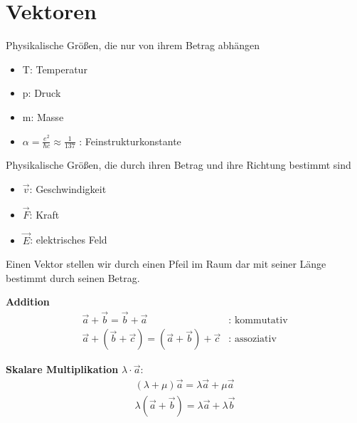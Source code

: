 \section{Vektoren}

\begin{Definition}[Skalar]
 Physikalische Größen, die nur von ihrem Betrag abhängen
\begin{itemize}
 \item T: Temperatur
\item p: Druck
\item m: Masse
\item $\alpha = \frac{e^2}{\hbar c} \approx \frac{1}{137}$ : Feinstrukturkonstante
\end{itemize}
\end{Definition}

\begin{Definition}[Vektor]
 Physikalische Größen, die durch ihren Betrag und ihre Richtung bestimmt sind
\begin{itemize}
 \item $\vec v$: Geschwindigkeit
\item $\vec F$: Kraft
\item $\vec E$: elektrisches Feld
\end{itemize}
\end{Definition}

Einen Vektor stellen wir durch einen Pfeil im Raum dar mit seiner Länge bestimmt durch seinen Betrag.
\par{\bf Addition}
\begin{align*}
 \vec a + \vec b = \vec b + \vec a & : \text{ kommutativ}\\
 \vec a + (\vec b + \vec c) = (\vec a + \vec b) + \vec c & : \text{ assoziativ}
\end{align*} 
\par{\bf Skalare Multiplikation} $\lambda \cdot \vec a$:
\begin{align*}
 (\lambda + \mu) \vec a = \lambda \vec a + \mu \vec a\\
\lambda (\vec a + \vec b) = \lambda \vec a + \lambda \vec b
\end{align*} 

